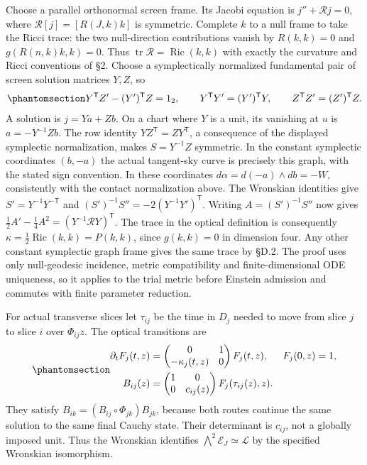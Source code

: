 \documentclass[
  english,
  11pt,
  reqno]{amsart}
\begin{document}
Choose a parallel orthonormal screen frame. Its Jacobi equation is
\(j''+\mathcal Rj=0\), where \(\mathcal R[j]=[R(J,k)k]\) is symmetric.
Complete \(k\) to a null frame to take the Ricci trace: the two
null-direction contributions vanish by \(R(k,k)=0\) and
\(g(R(n,k)k,k)=0\). Thus
\(\operatorname{tr}\mathcal R=\operatorname{Ric}(k,k)\) with exactly the
curvature and Ricci conventions of §2. Choose a symplectically
normalized fundamental pair of screen solution matrices \(Y,Z\), so
\begin{equation}\protect\phantomsection\label{eq:gg-geometric-jacobi-wronskians}{
 Y^{\mathsf T}Z'-(Y')^{\mathsf T}Z=1_2,\qquad
 Y^{\mathsf T}Y'=(Y')^{\mathsf T}Y,\qquad
 Z^{\mathsf T}Z'=(Z')^{\mathsf T}Z.
}\end{equation} A solution is \(j=Ya+Zb\). On a chart where \(Y\) is a
unit, its vanishing at \(u\) is \(a=-Y^{-1}Zb\). The row identity
\(YZ^{\mathsf T}=ZY^{\mathsf T}\), a consequence of the displayed
symplectic normalization, makes \(S=Y^{-1}Z\) symmetric. In the constant
symplectic coordinates \((b,-a)\) the actual tangent-sky curve is
precisely this graph, with the stated sign convention. In these
coordinates \(d\alpha=d(-a)\wedge db=-W\), consistently with the contact
normalization above. The Wronskian identities give
\(S'=Y^{-1}Y^{-{\mathsf T}}\) and
\((S')^{-1}S''=-2(Y^{-1}Y')^{\mathsf T}\). Writing \(A=(S')^{-1}S''\)
now gives \(\frac12A'-\frac14A^2=(Y^{-1}\mathcal RY)^{\mathsf T}\). The
trace in the optical definition is consequently
\(\kappa=\frac12\operatorname{Ric}(k,k)=P(k,k)\), since \(g(k,k)=0\) in
dimension four. Any other constant symplectic graph frame gives the same
trace by §D.2. The proof uses only null-geodesic incidence, metric
compatibility and finite-dimensional ODE uniqueness, so it applies to
the trial metric before Einstein admission and commutes with finite
parameter reduction.

For actual transverse slices let \(\tau_{ij}\) be the time in \(D_j\)
needed to move from slice \(j\) to slice \(i\) over \(\Phi_{ij}z\). The
optical transitions are
\begin{equation}\protect\phantomsection\label{eq:gg-actual-optical-transitions}{
 \begin{aligned}
 \partial_tF_j(t,z)
  &=\begin{pmatrix}0&1\\-\kappa_j(t,z)&0\end{pmatrix}F_j(t,z),
       &F_j(0,z)&=1,\\
 B_{ij}(z)
  &=\begin{pmatrix}1&0\\0&c_{ij}(z)\end{pmatrix}
                         F_j(\tau_{ij}(z),z).
 \end{aligned}
}\end{equation} They satisfy \(B_{ik}=(B_{ij}\circ\Phi_{jk})B_{jk}\),
because both routes continue the same solution to the same final Cauchy
state. Their determinant is \(c_{ij}\), not a globally imposed unit.
Thus the Wronskian identifies
\(\bigwedge^2\mathcal E_J\simeq\mathcal L\) by the specified Wronskian
isomorphism.
\end{document}
